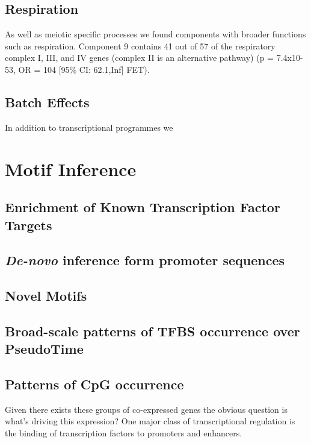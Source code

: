 \subsection{Respiration}

As well as meiotic specific processes we found components with broader functions such as respiration. Component 9 contains 41 out of 57 of the respiratory complex I, III, and IV genes (complex II is an alternative pathway) (p = 7.4x10-53, OR = 104 [95\% CI: 62.1,Inf] FET).

\subsection{Batch Effects}

In addition to transcriptional programmes we 

\section{Motif Inference}

\subsection{Enrichment of Known Transcription Factor Targets}

\subsection{\emph{De-novo} inference form promoter sequences}

\subsection{Novel Motifs}

\subsection{Broad-scale patterns of TFBS occurrence over PseudoTime}

\subsection{Patterns of CpG occurrence}

Given there exists these groups of co-expressed genes the obvious question is what's driving this expression? One major class of transcriptional regulation is the binding of transcription factors to promoters and enhancers.


